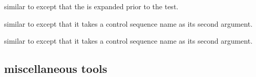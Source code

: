 \begin{ltxsyntax}
\begin{ltxcode}
\renewcommand*{\do}[1]{%
  \ifstrequal{#1}{<<item>>}
    {item found!\listbreak}
    {}}
\dolistloop{\mylist}
\end{ltxcode}


similar to  except that the  is expanded prior to the test.


similar to  except that it takes a control sequence name as its second argument.


similar to  except that it takes a control sequence name as its second argument.

\end{ltxsyntax}

\subsection{miscellaneous tools}
\label{aut:msc}

